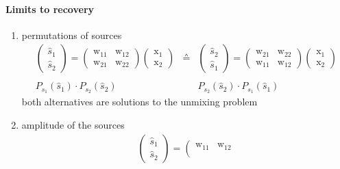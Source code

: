 \paragraph{Limits to recovery}
\begin{enumerate}[(1)]
\item permutations of sources
\begin{equation*}
	\begin{array}{ccc}
	\left( \begin{array}{ll}
		\widehat{s}_1 \\ \widehat{s}_2
	\end{array} \right)
	=
	\left( \begin{array}{ll}
		\mathrm{w}_{11} & \mathrm{w}_{12} \\
		\mathrm{w}_{21} & \mathrm{w}_{22} 
	\end{array} \right)
	\left( \begin{array}{ll}
		\mathrm{x}_1 \\ \mathrm{x}_2
	\end{array} \right)
	& \corresponds &
	\left( \begin{array}{ll}
		\widehat{s}_2 \\ \widehat{s}_1
	\end{array} \right)
	=
	\left( \begin{array}{ll}
		\mathrm{w}_{21} & \mathrm{w}_{22} \\
		\mathrm{w}_{11} & \mathrm{w}_{12} 
	\end{array} \right)
	\left( \begin{array}{ll}
		\mathrm{x}_1 \\ \mathrm{x}_2
	\end{array} \right)
	\\\\
	P_{s_1} (\widehat{s}_1) \cdot P_{s_2} (\widehat{s}_2)
	&& 
	P_{s_2} (\widehat{s}_2) \cdot P_{s_1} (\widehat{s}_1)
	\end{array}
\end{equation*}
\indent both alternatives are solutions to the unmixing problem
\item amplitude of the sources
\begin{equation*}
	\begin{array}{ccc}
	\left( \begin{array}{ll}
		\widehat{s}_1 \\ \widehat{s}_2
	\end{array} \right)
	=
	\left( \begin{array}{ll}
		\mathrm{w}_{11} & \mathrm{w}_{12} \\

\end{array}
\end{array}
\end{equation*}
\end{enumerate}

